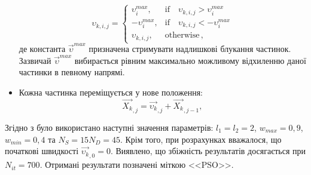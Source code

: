\begin{itemize}[leftmargin=0cm,itemindent=1em]
 \begin{equation}
 \label{PSO_Vmax}
 \upsilon_{k,i,j}=\left\{
 \begin{array}{ll}
 \upsilon_{i}^{max},& \text{if} \quad \upsilon_{k,i,j}>\upsilon_{i}^{max}\\
 -\upsilon_{i}^{max},& \text{if} \quad \upsilon_{k,i,j}<-\upsilon_{i}^{max}\\
 \upsilon_{k,i,j},& \text{otherwise}\,,
 \end{array}
 \right.
 \end{equation}
де
константа $ \overrightarrow{\upsilon}^{max}$  призначена стримувати надлишкові блукання частинок.
Зазвичай \cite{PSO_Ye} $ \overrightarrow{\upsilon}^{max}$ вибирається рівним максимально можливому відхиленню даної частинки в певному напрямі.
 \item Кожна частинка переміщується у нове положення:
 \begin{equation}
 \label{eqPSO_Final}
 \overrightarrow{X_{k}}_{,j}=\overrightarrow{\upsilon_{k}}_{,j}+\overrightarrow{X_{k}}_{,j-1},
 \end{equation}
\end{itemize}
Згідно з \cite{PSO_Ye} було використано наступні значення параметрів:
$l_1=l_2=2$, $w_{max}=0,9$, $w_{min}=0,4$ та $N_S=15N_D=45$.
Крім того, при розрахунках вважалося, що початкові швидкості $\overrightarrow{\upsilon_{k}}_{,0}=0$.
Виявлено, що збіжність результатів досягається при $N_{it}=700$.
Отримані результати позначені міткою <<PSO>>.


